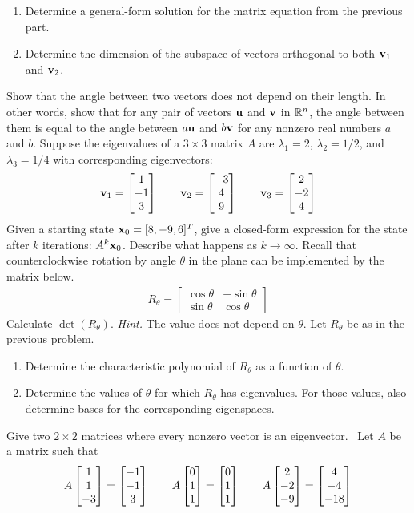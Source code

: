 \begin{tasks}[resume, style=enumerate]
\begin{enumerate}[label=(\alph*)]
  \item
    Determine a general-form solution for the matrix equation from the
    previous part.
  \item
    Determine the dimension of the subspace of vectors orthogonal to
    both $\mathbf v_1$ and $\mathbf v_2$.
  \end{enumerate}
\task
  Show that the angle between two vectors does not depend on their
  length. In other words, show that for any pair of vectors $\mathbf u$ and
  $\mathbf v$ in $\mathbb R^n$, the angle between them is equal to the angle
  between $a\mathbf u$ and $b\mathbf v$ for any nonzero real numbers $a$ and $b$.
\task
  Suppose the eigenvalues of a $3 \times 3$ matrix $A$ are $\lambda_1
  = 2$, $\lambda_2 = 1/2$, and $\lambda_3 = 1/4$ with corresponding
  eigenvectors:
  \begin{displaymath}
    \mathbf v_1 =  \begin{bmatrix} 1 \\ -1 \\ 3 \end{bmatrix} 
    \qquad
    \mathbf v_2 =  \begin{bmatrix} -3 \\ 4 \\ 9 \end{bmatrix} 
    \qquad
    \mathbf v_3 =  \begin{bmatrix} 2 \\ -2 \\ 4 \end{bmatrix} 
  \end{displaymath}
  Given a starting state $\mathbf x_0 = [8, -9, 6]^T$, give a closed-form
  expression for the state after $k$ iterations: $A^k \mathbf x_0$. Describe
  what happens as $k \to \infty$.
\task
  Recall that counterclockwise rotation by angle $\theta$ in the plane
  can be implemented by the matrix below.
  \begin{align*}
    R_\theta = \begin{bmatrix}
      \cos \theta & -\sin \theta \\
      \sin \theta & \cos \theta
    \end{bmatrix}
  \end{align*}
  Calculate $\det (R_\theta)$.
  \textit{Hint.} The value does not depend on $\theta$.
\task
  Let $R_\theta$ be as in the previous problem.
  \begin{enumerate}[label=(\alph*)]
  \item
    Determine the characteristic polynomial of $R_\theta$ as a function
    of $\theta$.
  \item
    Determine the values of $\theta$ for which $R_\theta$ has eigenvalues.
    For those values, also determine bases for the corresponding eigenspaces.
  \end{enumerate}
\task
  Give two $2 \times 2$ matrices where every nonzero vector is an
  eigenvector.
\task
  \faCalculator \ Let $A$ be a matrix such that
  \begin{displaymath}
    A \vThree 1 1 {-3} = \vThree {-1} {-1} 3
    \qquad
    A \vThree 0 1 1 = \vThree 0 1 1
    \qquad
    A \vThree 2 {-2} {-9} = \vThree 4 {-4} {-18}

\end{displaymath}
\end{tasks}
